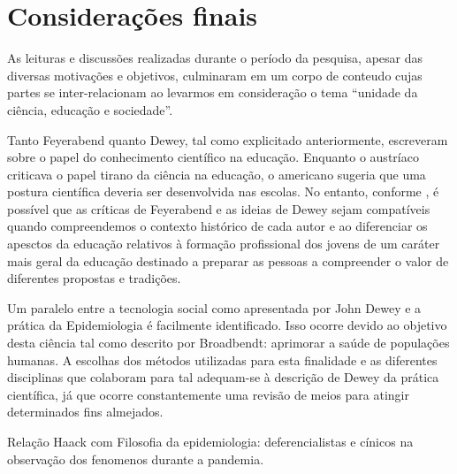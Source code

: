 \documentclass[12pt]{report}
\begin{document}
	

	\vspace*{-0.6cm}
	\chapter*{Considerações finais}
	\vspace*{-0.75cm}
	
	As leituras e discussões realizadas durante o período da pesquisa, apesar das diversas motivações e objetivos, culminaram em um corpo de conteudo cujas partes se inter-relacionam ao levarmos em consideração o tema ``unidade da ciência, educação e sociedade''.
	
	Tanto Feyerabend quanto Dewey, tal como explicitado anteriormente, escreveram sobre o papel do conhecimento científico na educação.
	Enquanto o austríaco criticava o papel tirano da ciência na educação, o americano sugeria que uma postura científica deveria ser desenvolvida nas escolas.
	No entanto, conforme \textcite{cunha_sci_and_edu}, é possível que as críticas de Feyerabend e as ideias de Dewey sejam compatíveis quando compreendemos o contexto histórico de cada autor e ao diferenciar os apesctos da educação relativos à formação profissional dos jovens de um caráter mais geral da educação destinado a preparar as pessoas a compreender o valor de diferentes propostas e tradições.
	
	Um paralelo entre a tecnologia social como apresentada por John Dewey e a prática da Epidemiologia é facilmente identificado.
	Isso ocorre devido ao objetivo desta ciência tal como descrito por Broadbendt: aprimorar a saúde de populações humanas.
	A escolhas dos métodos utilizadas para esta finalidade e as diferentes disciplinas que colaboram para tal adequam-se à descrição de Dewey da prática científica, já que ocorre constantemente uma revisão de meios para atingir determinados fins almejados.
	
	Relação Haack com Filosofia da epidemiologia: deferencialistas e cínicos na observação dos fenomenos durante a pandemia.
	\newpage
	\vspace*{-3cm}
	\printbibliography
	
\end{document}
